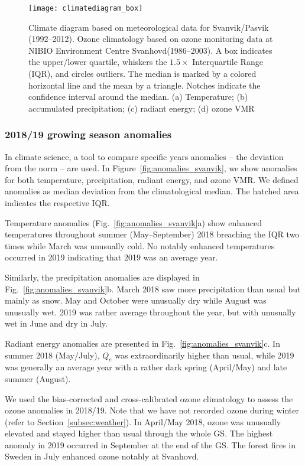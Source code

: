 \documentclass[bg, manuscript]{copernicus}
\begin{document}
\begin{figure*}[t]
  \texttt{[image: climatediagram\_box]}
  \caption{Climate diagram based on meteorological data for Svanvik/Pasvik (1992--2012). Ozone climatology based on ozone monitoring data at NIBIO Environment Centre Svanhovd(1986--2003). A box indicates the upper/lower quartile, whiskers the $1.5\times$ Interquartile Range (IQR), and circles outliers. The median is marked by a colored horizontal line and the mean by a triangle. Notches indicate the confidence interval around the median. (a) Temperature; (b) accumulated precipitation; (c) radiant energy; (d) ozone VMR}
  \label{fig:climatediagram}
\end{figure*}

\subsubsection{2018/19 growing season anomalies}
\label{subsec:anomalies}

In climate science, a tool to compare specific years anomalies -- the deviation from the norm --  are used. In Figure~\ref{fig:anomalies_svanvik}, we show anomalies for both temperature, precipitation, radiant energy, and ozone VMR. We defined anomalies as median deviation from the climatological median. The hatched area indicates the respective IQR.

Temperature anomalies (Fig.~\ref{fig:anomalies_svanvik}a) show enhanced temperatures throughout summer (May--September) 2018 breaching the IQR two times while March was unusually cold. No notably enhanced temperatures occurred in 2019 indicating that 2019 was an average year.

Similarly, the precipitation anomalies are displayed in Fig.~\ref{fig:anomalies_svanvik}b. March 2018 saw more precipitation than usual but mainly as snow. May and October were unusually dry while August was unusually wet. 2019 was rather average throughout the year, but with unusually wet in June and dry in July.

Radiant energy anomalies are presented in Fig.~\ref{fig:anomalies_svanvik}c. In summer 2018 (May/July), $Q_e$ was extraordinarily higher than usual, while 2019 was generally an average year with a rather dark spring (April/May) and late summer (August).

We used the bias-corrected and cross-calibrated ozone climatology \citep{ACP:Falk2021} to assess the ozone anomalies in 2018/19. Note that we have not recorded ozone during winter (refer to Section~\ref{subsec:weather}). In April/May 2018, ozone was unusually elevated and stayed higher than usual through the whole GS. The highest anomaly in 2019 occurred in September at the end of the GS. The forest fires in Sweden in July enhanced ozone notably at Svanhovd.
\end{document}

